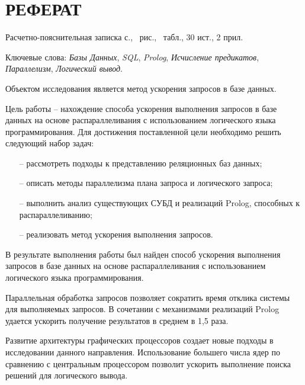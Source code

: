 \chapter*{\hfill{\centering РЕФЕРАТ}\hfill}

Расчетно-пояснительная записка \pageref{LastPage} с., \totalfigures\ рис., \totaltables\ табл., 30 ист., 2 прил.

Ключевые слова: \textit{Базы Данных}, \textit{SQL}, \textit{Prolog}, \textit{Исчисление предикатов}, \textit{Параллелизм}, \textit{Логический вывод}.

Объектом исследования является метод ускорения запросов в базе данных.

Цель работы -- нахождение способа ускорения выполнения запросов в базе данных на основе распараллеливания с использованием логического языка программирования. Для достижения поставленной цели необходимо решить следующий набор задач:
\begin{itemize}
	\item [--] рассмотреть подходы к представлению реляционных баз данных;
	\item [--] описать методы параллелизма плана запроса и логического запроса;
	\item [--] выполнить анализ существующих СУБД и реализаций Prolog, способных к распараллеливанию;
	\item [--] реализовать метод ускорения выполнения запросов.
\end{itemize}

В результате выполнения работы был найден способ ускорения выполнения запросов в базе данных на основе распараллеливания с использованием логического языка программирования. 

Параллельная обработка запросов позволяет сократить время отклика системы для выполняемых запросов. В сочетании с механизмами реализаций Prolog удается ускорить получение результатов в среднем в 1,5 раза.

Развитие архитектуры графических процессоров создает новые подходы
в исследовании данного направления. Использование большего числа ядер
по сравнению с центральным процессором позволит ускорить выполнение
поиска решений для логического вывода.